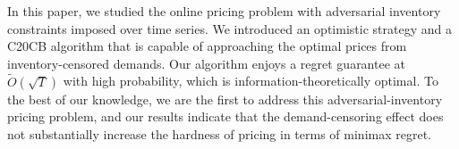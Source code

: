 In this paper, we studied the online pricing problem with adversarial inventory constraints imposed over time series. We introduced an optimistic strategy and a C20CB algorithm that is capable of approaching the optimal prices from inventory-censored demands. Our algorithm enjoys a regret guarantee at $\tilde{O}(\sqrt{T})$ with high probability, which is information-theoretically optimal. To the best of our knowledge, we are the first to address this adversarial-inventory pricing problem, and our results indicate that the demand-censoring effect does not substantially increase the hardness of pricing in terms of minimax regret.